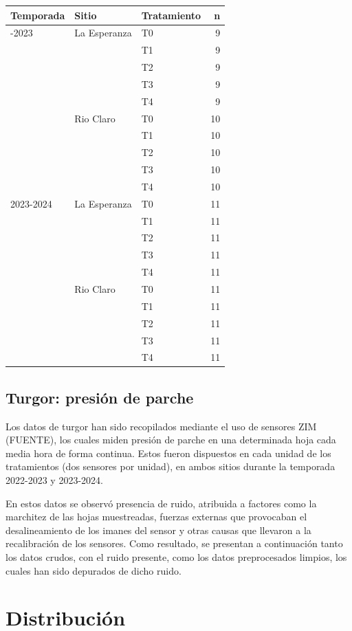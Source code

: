 \documentclass[
  letterpaper,
  DIV=11,
  numbers=noendperiod]{scrreprt}
\begin{document}
\begin{longtable}[]{@{}lllr@{}}
\toprule\noalign{}
Temporada & Sitio & Tratamiento & n \\
\midrule\noalign{}
\endhead
\bottomrule\noalign{}
\endlastfoot
2022-2023 & La Esperanza & T0 & 9 \\
& & T1 & 9 \\
& & T2 & 9 \\
& & T3 & 9 \\
& & T4 & 9 \\
& Rio Claro & T0 & 10 \\
& & T1 & 10 \\
& & T2 & 10 \\
& & T3 & 10 \\
& & T4 & 10 \\
2023-2024 & La Esperanza & T0 & 11 \\
& & T1 & 11 \\
& & T2 & 11 \\
& & T3 & 11 \\
& & T4 & 11 \\
& Rio Claro & T0 & 11 \\
& & T1 & 11 \\
& & T2 & 11 \\
& & T3 & 11 \\
& & T4 & 11 \\
\end{longtable}

\section{Turgor: presión de parche}\label{sec-turgor}

Los datos de turgor han sido recopilados mediante el uso de sensores ZIM
(FUENTE), los cuales miden presión de parche en una determinada hoja
cada media hora de forma continua. Estos fueron dispuestos en cada
unidad de los tratamientos (dos sensores por unidad), en ambos sitios
durante la temporada 2022-2023 y 2023-2024.

En estos datos se observó presencia de ruido, atribuida a factores como
la marchitez de las hojas muestreadas, fuerzas externas que provocaban
el desalineamiento de los imanes del sensor y otras causas que llevaron
a la recalibración de los sensores. Como resultado, se presentan a
continuación tanto los datos crudos, con el ruido presente, como los
datos preprocesados limpios, los cuales han sido depurados de dicho
ruido.

\chapter{Distribución}
\end{document}
